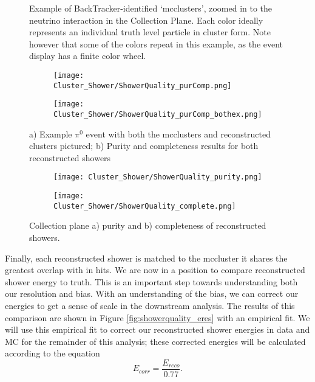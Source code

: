\begin{figure}[h!]
\centering
{}
\caption{ Example of BackTracker-identified `mcclusters', zoomed in to the neutrino interaction in the Collection Plane. Each color ideally represents an individual truth level particle in cluster form. Note however that some of the colors repeat in this example, as the event display has a finite color wheel. }
\label{fig:mcclusters}
\end{figure}

\begin{figure}[t!]
\centering
  \begin{subfigure}[t]{0.4\textwidth}
    \centering
\texttt{[image: Cluster\_Shower/ShowerQuality\_purComp.png]}
  \caption{ }
  \end{subfigure} 
  \hspace{5mm}
  \begin{subfigure}[t]{0.45\textwidth}
    \centering
\texttt{[image: Cluster\_Shower/ShowerQuality\_purComp\_bothex.png]}
  \caption{ }
  \end{subfigure} 
\caption{a) Example $\pi^0$ event with both the mcclusters and reconstructed clusters pictured; b) Purity and completeness results for both reconstructed showers }
\label{fig:showerquality_purcompex}
\end{figure}


\begin{figure}[t!]
\centering
  \begin{subfigure}[t]{0.45\textwidth}
    \centering
\texttt{[image: Cluster\_Shower/ShowerQuality\_purity.png]}
  \caption{ }
  \end{subfigure} 
  \hspace{3mm}
  \begin{subfigure}[t]{0.45\textwidth}
    \centering
\texttt{[image: Cluster\_Shower/ShowerQuality\_complete.png]}
  \caption{ }
  \end{subfigure} 
\caption{Collection plane a) purity and b) completeness of reconstructed showers. }
\label{fig:showerquality_purcomp}
\end{figure}

\par  Finally, each reconstructed shower is matched to the mccluster it shares the greatest overlap with in hits. We are now in a position to compare reconstructed shower energy to truth. This is an important step towards understanding both our resolution and bias. With an understanding of the bias, we can correct our energies to get a sense of scale in the downstream analysis. The results of this comparison are shown in Figure \ref{fig:showerquality_eres} with an empirical fit. We will use this empirical fit to correct our reconstructed shower energies in data and MC for the remainder of this analysis; these corrected energies will be calculated according to the equation
\begin{equation}
\label{eq:ecorr}
E_{corr} = \frac{E_{reco}}{0.77} .
\end{equation}

